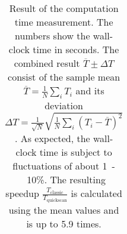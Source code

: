 \begin{table}[htbp]
\begin{tabular}{| c | c | c  c  c  c  c || c | c | }
		\hline
	\end{tabular}
	\caption{Result of the computation time measurement. The numbers show the wall-clock time in seconds. The combined result $\overline{T} \pm \Delta T$ consist of the sample mean ${\overline{T} = \frac{1}{N} \sum_i T_i}$ and its deviation ${\Delta T = \frac{1}{\sqrt{N}} \sqrt{\frac{1}{N} \sum_i (T_i - \overline{T})^2}}$. As expected, the wall-clock time is subject to fluctuations of about \unit{1-10}{\%}. The resulting speedup $\frac{T_{\textrm{classic}}}{T_{\textrm{quickscan}}}$ is calculated using the mean values and is up to 5.9 times.}
	\label{tbl:timing_results}
\end{table}
